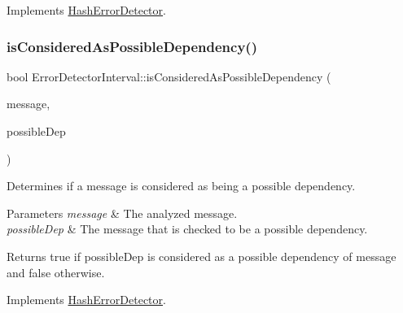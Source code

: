 Implements \hyperlink{class_hash_error_detector_a4693d4d5e327b19f75088cef52bcad7d}{Hash\+Error\+Detector}.

\mbox{\label{class_error_detector_interval_a33bf470042fb65d833fd0f091374a046}} 
\subsubsection{\texorpdfstring{is\+Considered\+As\+Possible\+Dependency()}{isConsideredAsPossibleDependency()}}
{\footnotesize\ttfamily bool Error\+Detector\+Interval\+::is\+Considered\+As\+Possible\+Dependency (\begin{DoxyParamCaption}\item[{const \hyperlink{structures_8h_a7e7bdc1d2fff8a9436f2f352b2711ed6}{message\+Info} \&}]{message,  }\item[{const \hyperlink{structures_8h_a7e7bdc1d2fff8a9436f2f352b2711ed6}{message\+Info} \&}]{possible\+Dep }\end{DoxyParamCaption})\hspace{0.3cm}{\ttfamily [virtual]}}



Determines if a message is considered as being a possible dependency. 


\begin{DoxyParams}{Parameters}
{\em message} & The analyzed message. \\
\hline
{\em possible\+Dep} & The message that is checked to be a possible dependency. \\
\hline
\end{DoxyParams}
\begin{DoxyReturn}{Returns}
true if possible\+Dep is considered as a possible dependency of message and false otherwise. 
\end{DoxyReturn}


Implements \hyperlink{class_hash_error_detector_ac0a25b9c1e27f98223869d11ca46d18f}{Hash\+Error\+Detector}.

\mbox{\label{class_error_detector_interval_ae74b39e397894e3485c2f7869fca8fb0}} 
